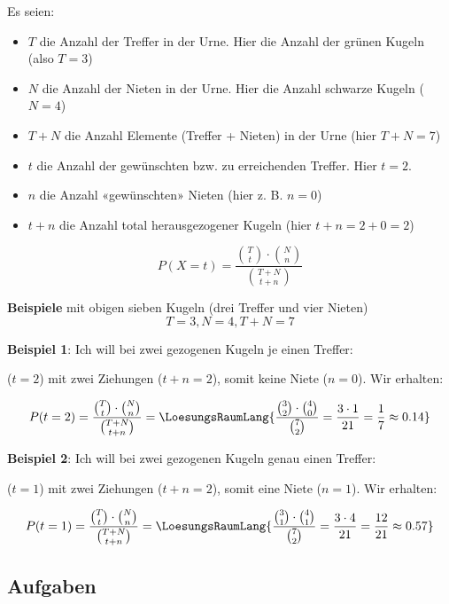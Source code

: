 Es seien:
\begin{itemize}
\item $T$ die Anzahl der Treffer in der Urne. Hier die Anzahl der grünen Kugeln (also $T = 3$)
\item $N$ die Anzahl der Nieten in der Urne. Hier die Anzahl schwarze Kugeln ($N=4$)
\item $T+N$ die Anzahl Elemente (Treffer + Nieten) in der Urne (hier $T+N = 7$)

\item $t$ die Anzahl der gewünschten bzw. zu erreichenden Treffer. Hier \zB $t=2$.
  
\item $n$ die Anzahl «gewünschten» Nieten (hier z. B. $n = 0$)
\item $t+n$ die Anzahl total herausgezogener Kugeln (hier $t+n=2+0=2$)
\end{itemize}
\begin{gesetz}{}{}
$$P(X=t) = \frac{ {T\choose t} \cdot{} {{N}\choose {n}}}{{{T+N} \choose {t+n}}}$$
\end{gesetz}
\textbf{Beispiele} mit obigen sieben Kugeln (drei Treffer und vier
Nieten)
$$T=3, N=4, T+N=7$$

\textbf{Beispiel 1}: Ich will bei zwei gezogenen Kugeln je einen Treffer:

($t=2$) mit zwei Ziehungen ($t+n=2$), somit keine Niete ($n=0$).
Wir erhalten:

$$P(t=2) = \frac{ {T\choose t} \cdot{} {{N}\choose {n}}}{{{T+N}
    \choose {t+n}}} = \LoesungsRaumLang{\frac{ {3\choose 2} \cdot{} {{4}\choose {0}}}{{7
    \choose 2}} = \frac{3\cdot{}1}{21} = \frac17 \approx 0.14}$$

\textbf{Beispiel 2}: Ich will bei zwei gezogenen Kugeln genau einen Treffer:

($t=1$) mit zwei Ziehungen ($t+n=2$), somit eine Niete ($n=1$).
Wir erhalten:

$$P(t=1) = \frac{ {T\choose t} \cdot{} {{N}\choose {n}}}{{{T+N}
    \choose {t+n}}} = \LoesungsRaumLang{\frac{ {3\choose 1} \cdot{} {{4}\choose {1}}}{{7
    \choose 2}} = \frac{3\cdot{4}}{21} = \frac{12}{21} \approx 0.57}$$


\newpage

\subsection*{Aufgaben}

\newpage

